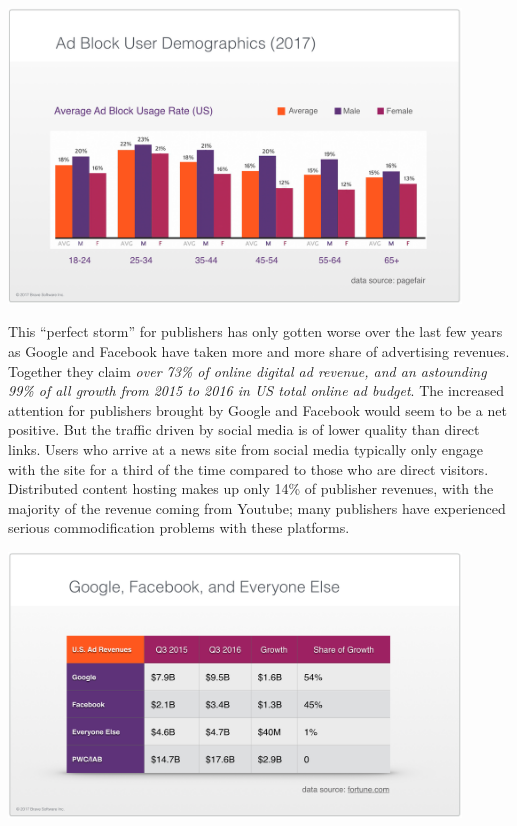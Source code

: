 \documentclass[11pt]{article}
\begin{document}
\begin{center}
\includegraphics[width=0.9\textwidth]{adblock_usage_demographics.png}
\end{center}

This “perfect storm” for publishers has only gotten worse over the last few years as Google and Facebook have taken more and more share of advertising revenues. Together they claim \textit{over 73\% of online digital ad revenue, and an astounding 99\% of all growth from 2015 to 2016 in US total online ad budget}\cite{12}.
The increased attention for publishers brought by Google and Facebook would seem to be a net positive. But the traffic driven by social media is of lower quality than direct links. Users who arrive at a news site from social media typically only engage with the site for a third\cite{SocMed} of the time compared to those who are direct visitors. Distributed content hosting makes up only 14\% of publisher revenues, with the majority of the revenue coming from Youtube\cite{DCN}; many publishers have experienced serious commodification problems with these platforms.

\begin{center}
\includegraphics[width=0.9\textwidth]{google_FB_everyone.png}
\end{center}
\end{document}
